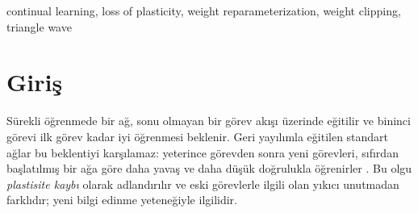 \documentclass[conference,a4paper]{IEEEtran}
\renewcommand{\IEEEkeywordsname}{Anahtar Kelimeler}
\begin{document}
\begin{otherlanguage}{english}
\renewcommand{\abstractname}{Abstract}
\renewcommand{\IEEEkeywordsname}{Keywords}
\begin{abstract}
Neural networks trained on a long sequence of tasks gradually lose the ability to learn new ones, a phenomenon
known as loss of plasticity. Growth of the weight magnitude is one known cause, and keeping the weights inside a
fixed interval is an effective remedy. This preliminary study examines empirically whether boundedness alone is
sufficient. Each weight is written as $W=A\,f(\Theta/A)$, and a smooth periodic map (sine), a smooth non-periodic
map (tanh) and a piecewise-linear periodic map (triangle wave) are compared with the standard network and with
weight clipping. On Online Permuted MNIST with a 200-task stream and up to ten paired seeds, the smooth maps are
slightly better than the standard network but do not preserve plasticity (retention ratio 0.93 versus 0.91).
Their weights drift towards the bound, where the derivative of the map approaches zero, and the mean step
multiplier falls from 0.85 to 0.56 for sine and from 0.74 to 0.47 for tanh. The triangle wave, whose derivative
has unit magnitude away from its corner points, shows no loss (retention ratio 1.02) and could not be
distinguished from weight clipping; it was not observed to improve on it. The findings are limited to one
dataset, a small network and a short stream.
\end{abstract}
\begin{IEEEkeywords}
continual learning, loss of plasticity, weight reparameterization, weight clipping, triangle wave
\end{IEEEkeywords}
\end{otherlanguage}

\section{Giriş}

Sürekli öğrenmede bir ağ, sonu olmayan bir görev akışı üzerinde eğitilir ve bininci görevi ilk görev kadar iyi
öğrenmesi beklenir. Geri yayılımla eğitilen standart ağlar bu beklentiyi karşılamaz: yeterince görevden sonra
yeni görevleri, sıfırdan başlatılmış bir ağa göre daha yavaş ve daha düşük doğrulukla öğrenirler
\cite{ash2020warm,lyle2023understanding,dohare2024loss}. Bu olgu \emph{plastisite kaybı}
olarak adlandırılır ve eski görevlerle ilgili olan yıkıcı unutmadan farklıdır; yeni bilgi edinme yeteneğiyle
ilgilidir.
\end{document}
